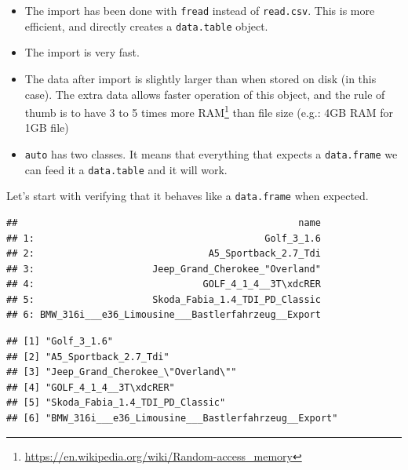\documentclass[]{book}
\newenvironment{Shaded}{\begin{snugshade}}{\end{snugshade}}
\newcommand{\DecValTok}[1]{\textcolor[rgb]{0.00,0.00,0.81}{#1}}
\newcommand{\NormalTok}[1]{#1}
\newcommand{\OperatorTok}[1]{\textcolor[rgb]{0.81,0.36,0.00}{\textbf{#1}}}
\newcommand{\StringTok}[1]{\textcolor[rgb]{0.31,0.60,0.02}{#1}}
\providecommand{\tightlist}{%
  \setlength{\itemsep}{0pt}\setlength{\parskip}{0pt}}
\renewcommand{\href}[2]{#2\footnote{\url{#1}}}
\theoremstyle{definition}
\theoremstyle{definition}
\theoremstyle{definition}
\theoremstyle{remark}
\begin{document}
\begin{itemize}
\tightlist
\item
  The import has been done with \texttt{fread} instead of \texttt{read.csv}. This is more efficient, and directly creates a \texttt{data.table} object.
\item
  The import is very fast.
\item
  The data after import is slightly larger than when stored on disk (in this case). The extra data allows faster operation of this object, and the rule of thumb is to have 3 to 5 times more \href{https://en.wikipedia.org/wiki/Random-access_memory}{RAM} than file size (e.g.: 4GB RAM for 1GB file)
\item
  \texttt{auto} has two classes. It means that everything that expects a \texttt{data.frame} we can feed it a \texttt{data.table} and it will work.
\end{itemize}

Let's start with verifying that it behaves like a \texttt{data.frame} when expected.

\begin{Shaded}
\end{Shaded}

\begin{verbatim}
##                                                  name
## 1:                                         Golf_3_1.6
## 2:                               A5_Sportback_2.7_Tdi
## 3:                     Jeep_Grand_Cherokee_"Overland"
## 4:                              GOLF_4_1_4__3T\xdcRER
## 5:                     Skoda_Fabia_1.4_TDI_PD_Classic
## 6: BMW_316i___e36_Limousine___Bastlerfahrzeug__Export
\end{verbatim}

\begin{Shaded}
\end{Shaded}

\begin{verbatim}
## [1] "Golf_3_1.6"                                        
## [2] "A5_Sportback_2.7_Tdi"                              
## [3] "Jeep_Grand_Cherokee_\"Overland\""                  
## [4] "GOLF_4_1_4__3T\xdcRER"                             
## [5] "Skoda_Fabia_1.4_TDI_PD_Classic"                    
## [6] "BMW_316i___e36_Limousine___Bastlerfahrzeug__Export"
\end{verbatim}
\end{document}
